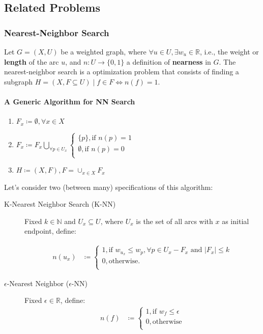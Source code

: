 \subsection{Related Problems}

\subsubsection{Nearest-Neighbor Search}

Let $G = (X, U)$ be a weighted graph, where $ \forall u \in U, \exists w_u \in \mathbb{R}$, i.e., the weight or \textbf{length} of the arc $u$, and $n\colon U \to \{0, 1\}$ a definition of \textbf{nearness} in $G$. The nearest-neighbor search is a optimization problem that consists of finding a subgraph $H = (X, F \subseteq U) \mid f \in F \iff n(f) = 1$.

\paragraph{A Generic Algorithm for NN Search}
\begin{enumerate}
	\item $F_x \coloneqq \emptyset, \forall x \in X$
	\item $F_x \coloneqq F_x \bigcup_{\forall p \in U_x} \begin{cases}
	\{p\}, \text{if } n(p) = 1 \\
	\emptyset, \text{if } n(p) = 0 \\
	\end{cases}$
	\item $H \coloneqq (X, F), F = \cup_{x\in X} F_x$
\end{enumerate}

Let's consider two (between many)  specifications of this algorithm:

\begin{description}
	\item[K-Nearest Neighbor Search (K-NN)] Fixed $k \in \mathbb{N}$ and $U_x \subseteq U$, where $U_x$ is the set of all arcs with $x$ as initial endpoint, define:

	\begin{align*}
	n(u_x) &\coloneqq \begin{cases}
		1, \text{if }  w_{u_x} \le w_p, \forall p \in U_x - F_x \text{ and } |F_x| \le k \\
		0, \text{otherwise.} \\
		\end{cases}
	\end{align*}

	\item[$\epsilon$-Nearest Neighbor ($\epsilon$-NN)] Fixed $\epsilon \in\mathbb{R}$, define:
	\begin{align*}
		n(f) &\coloneqq \begin{cases}
			1, \text{if } w_f \le \epsilon \\
			0, \text{otherwise} \\
		\end{cases}
	\end{align*}
\end{description}

